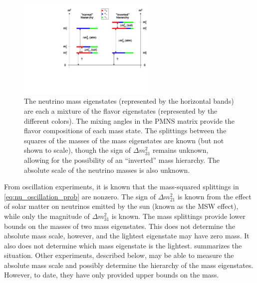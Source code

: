 \documentclass[herrin-thesis.tex]{subfiles}
\begin{document}
\begin{figure}[tbp]
	\centering
	\includegraphics[width=0.6\textwidth]{./plots/nu_mixing.pdf}
	\caption[Neutrino mixing]{The neutrino mass eigenstates (represented by the horizontal bands) are each a mixture of the flavor eigenstates (represented by the different colors). The mixing angles in the PMNS matrix provide the flavor compositions of each mass state. The splittings between the squares of the masses of the mass eigenstates are known (but not shown to scale), though the sign of \(\Delta m_{31}^2\) remains unknown, allowing for the possibility of an ``inverted'' mass hierarchy. The absolute scale of the neutrino masses is also unknown.}
	\label{fig:nu_mixing}
\end{figure}

From oscillation experiments, it is known that the mass-squared splittings in \cref{eq:nu_oscillation_prob} are nonzero. The sign of \(\Delta m_{21}^2\) is known from the effect of solar matter on neutrinos emitted by the sun (known as the MSW effect), while only the magnitude of \(\Delta m_{31}^2\) is known. The mass splittings provide lower bounds on the masses of two mass eigenstates. This does not determine the absolute mass scale, however, and the lightest eigenstate may have zero mass. It also does not determine which mass eigenstate is the lightest.  summarizes the situation. Other experiments, described below, may be able to measure the absolute mass scale and possibly determine the hierarchy of the mass eigenstates. However, to date, they have only provided upper bounds on the mass.
\end{document}
